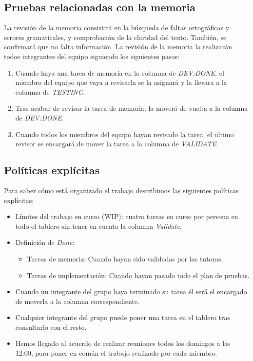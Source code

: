 \subsection{Pruebas relacionadas con la memoria}
La revisión de la memoria consistirá en la búsqueda de faltas ortográficas y errores gramaticales, y comprobación de la claridad del texto. También, se confirmará que no falta información.
La revisión de la memoria la realizarán todos integrantes del equipo siguiendo los siguientes pasos:
\begin{enumerate}
    \item Cuando haya una tarea de memoria en la columna de \textit{DEV:DONE}, el miembro del equipo que vaya a revisarla se la asignará y la llevara a la columna de \textit{TESTING}.
    \item Tras acabar de revisar la tarea de memoria, la moverá de vuelta a la columna de \textit{DEV:DONE}.
    \item Cuando todos los miembros del equipo hayan revisado la tarea, el ultimo revisor se encargará de mover la tarea a la columna de \textit{VALIDATE}.
\end{enumerate}

\subsection{Políticas explícitas}
Para saber cómo está organizado el trabajo describimos las siguientes políticas explícitas:

\begin{itemize}
    \item Límites del trabajo en curso (WIP): cuatro tareas en curso por persona en todo el tablero sin tener en cuenta la columna \textit{Validate}.
    \item Definición de \textit{Done}:
          \begin{itemize}
              \item Tareas de memoria: Cuando hayan sido validadas por las tutoras.
              \item Tareas de implementación: Cuando hayan pasado todo el plan de pruebas.
          \end{itemize}
    \item Cuando un integrante del grupo haya terminado su tarea él será el encargado de moverla a la columna correspondiente.
    \item Cualquier integrante del grupo puede poner una tarea en el tablero tras consultarlo con el resto.
    \item Hemos llegado al acuerdo de realizar reuniones todos los domingos a las 12:00, para poner en común el trabajo realizado por cada miembro.
\end{itemize}

